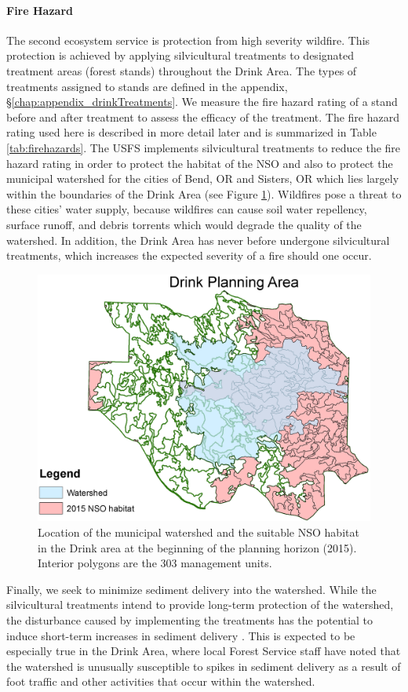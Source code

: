 \paragraph{Fire Hazard}
The second ecosystem service is protection from high severity wildfire. This protection is achieved by applying silvicultural treatments to designated treatment areas (forest stands) throughout the Drink Area. The types of treatments assigned to stands are defined in the appendix, \S \ref{chap:appendix_drinkTreatments}. We measure the fire hazard rating of a stand before and after treatment to assess the efficacy of the treatment. The fire hazard rating used here is described in more detail later and is summarized in Table \ref{tab:firehazards}. The USFS implements silvicultural treatments to reduce the fire hazard rating in order to protect the habitat of the NSO and also to protect the municipal watershed for the cities of Bend, OR and Sisters, OR which lies largely within the boundaries of the Drink Area (see Figure \ref{fig:drinkOwlAndWatershed}). Wildfires pose a threat to these cities' water supply, because wildfires can cause soil water repellency, surface runoff, and debris torrents \cite{ice2004effects} which would degrade the quality of the watershed. In addition, the Drink Area has never before undergone silvicultural treatments, which increases the expected severity of a fire should one occur. 
\begin{figure}
\centering
\includegraphics[width=.5\textwidth]{../images/DrinkMap_NSOAndWatershed}
\caption[NSO Habitat and municipal watershed in the Drink Planning Area]{Location of the municipal watershed and the suitable NSO habitat in the Drink area at the beginning of the planning horizon (2015). Interior polygons are the 303 management units.}
\label{fig:drinkOwlAndWatershed}
\end{figure}

Finally, we seek to minimize sediment delivery into the watershed. While the silvicultural treatments intend to provide long-term protection of the watershed, the disturbance caused by implementing the treatments has the potential to induce short-term increases in sediment delivery \cite{o2005conceptual}. This is expected to be especially true in the Drink Area, where local Forest Service staff have noted that the watershed is unusually susceptible to spikes in sediment delivery as a result of foot traffic and other activities that occur within the watershed.

